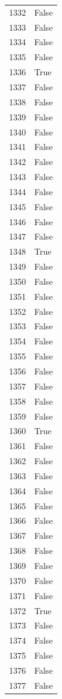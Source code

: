 \documentclass[
  letterpaper,
  DIV=11,
  numbers=noendperiod]{scrreprt}
\begin{document}
\begin{tabular}{ll}
1332 &  False \\
1333 &  False \\
1334 &  False \\
1335 &  False \\
1336 &   True \\
1337 &  False \\
1338 &  False \\
1339 &  False \\
1340 &  False \\
1341 &  False \\
1342 &  False \\
1343 &  False \\
1344 &  False \\
1345 &  False \\
1346 &  False \\
1347 &  False \\
1348 &   True \\
1349 &  False \\
1350 &  False \\
1351 &  False \\
1352 &  False \\
1353 &  False \\
1354 &  False \\
1355 &  False \\
1356 &  False \\
1357 &  False \\
1358 &  False \\
1359 &  False \\
1360 &   True \\
1361 &  False \\
1362 &  False \\
1363 &  False \\
1364 &  False \\
1365 &  False \\
1366 &  False \\
1367 &  False \\
1368 &  False \\
1369 &  False \\
1370 &  False \\
1371 &  False \\
1372 &   True \\
1373 &  False \\
1374 &  False \\
1375 &  False \\
1376 &  False \\
1377 &  False \\

\end{tabular}
\end{document}
